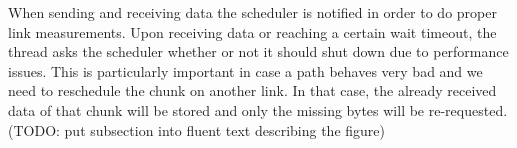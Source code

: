 When sending and receiving data the scheduler is notified in order to do proper link measurements. 
Upon receiving data or reaching a certain wait timeout, the thread asks the scheduler whether or not it should shut down due to performance issues. 
This is particularly important in case a path behaves very bad and we need to reschedule the chunk on another link. 
In that case, the already received data of that chunk will be stored and only the missing bytes will be re-requested. 
(TODO: put subsection into fluent text describing the figure)







